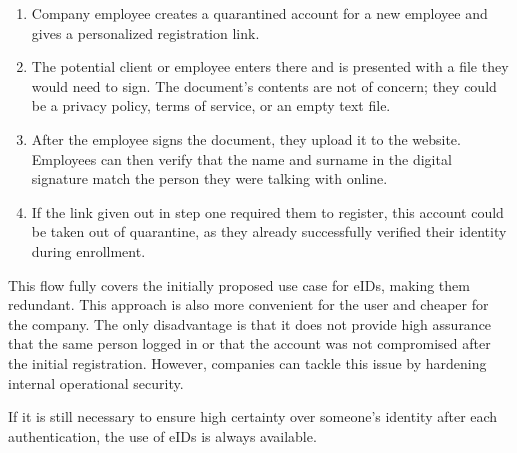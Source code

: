 \begin{enumerate}
    \item Company employee creates a quarantined account for a new employee and gives a personalized registration link.
    \item The potential client or employee enters there and is presented with a file they would need to sign. The document's contents are not of concern; they could be a privacy policy, terms of service, or an empty text file.
    \item After the employee signs the document, they upload it to the website. Employees can then verify that the name and surname in the digital signature match the person they were talking with online.
    \item If the link given out in step one required them to register, this account could be taken out of quarantine, as they already successfully verified their identity during enrollment.
\end{enumerate}

This flow fully covers the initially proposed use case for eIDs, making them redundant. This approach is also more convenient for the user and cheaper for the company. The only disadvantage is that it does not provide high assurance that the same person logged in or that the account was not compromised after the initial registration. However, companies can tackle this issue by hardening internal operational security.

If it is still necessary to ensure high certainty over someone's identity after each authentication, the use of eIDs is always available.